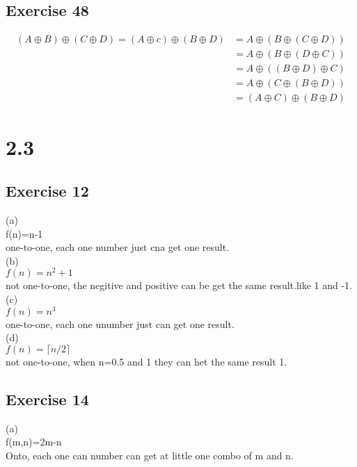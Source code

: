 \documentclass[12pt]{article}
\begin{document}
\subsection*{Exercise 48}
\begin{equation}\nonumber
    \begin{split}
    (A\oplus B)\oplus (C\oplus D)=(A\oplus c)\oplus (B\oplus D) 
    &=A\oplus (B\oplus (C\oplus D))\\
    &=A\oplus (B\oplus (D\oplus C))\\
    &=A\oplus ((B\oplus D)\oplus C)\\
    &=A\oplus (C\oplus (B\oplus D))\\
    &=(A\oplus C)\oplus (B\oplus D)
    \end{split}
\end{equation}
\section*{2.3}
\subsection*{Exercise 12}
(a)\\
f(n)=n-1\\
one-to-one, each one number just cna get one result.\\

(b)\\
$f(n)=n^2 +1$\\
not one-to-one, the negitive and positive can be get the same result.like 1 and -1.\\

(c)\\
$f(n)=n^3$\\
one-to-one, each one unumber just can get one result.\\

(d)\\
$f(n)=\lceil n/2\rceil$\\
not one-to-one, when n=0.5 and 1 they can het the same result 1.\\

\subsection*{Exercise 14}
(a)\\
f(m,n)=2m-n\\
Onto, each one can number can get at little one combo of m and n.\\
\end{document}
